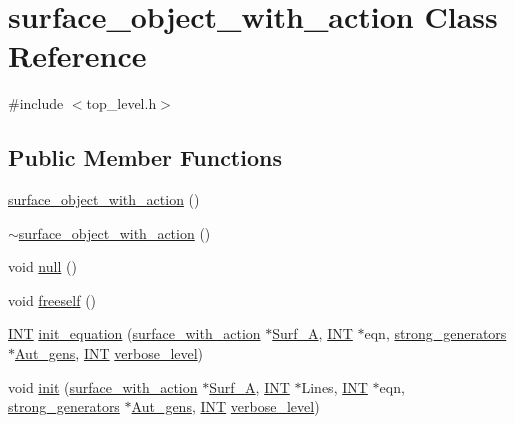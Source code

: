 \hypertarget{classsurface__object__with__action}{}\section{surface\+\_\+object\+\_\+with\+\_\+action Class Reference}
\label{classsurface__object__with__action}


{\ttfamily \#include $<$top\+\_\+level.\+h$>$}

\subsection*{Public Member Functions}
\begin{DoxyCompactItemize}
\item 
\mbox{\hyperlink{classsurface__object__with__action_a0bbd7fbace8f0057225b08c708c53d8d}{surface\+\_\+object\+\_\+with\+\_\+action}} ()
\item 
\mbox{\hyperlink{classsurface__object__with__action_a037d0d8b8dd76f7d37a827aef76b48eb}{$\sim$surface\+\_\+object\+\_\+with\+\_\+action}} ()
\item 
void \mbox{\hyperlink{classsurface__object__with__action_af479f5bae9a726bdc114648d0866a54f}{null}} ()
\item 
void \mbox{\hyperlink{classsurface__object__with__action_a736510cad6c3cd2dd2f554bcf05d5293}{freeself}} ()
\item 
\mbox{\hyperlink{galois_8h_a09fddde158a3a20bd2dcadb609de11dc}{I\+NT}} \mbox{\hyperlink{classsurface__object__with__action_a310ce4189e50545dd67fa3652b8fd160}{init\+\_\+equation}} (\mbox{\hyperlink{classsurface__with__action}{surface\+\_\+with\+\_\+action}} $\ast$\mbox{\hyperlink{classsurface__object__with__action_af67a9dfb692ea4ec1b68f77c76ee68d8}{Surf\+\_\+A}}, \mbox{\hyperlink{galois_8h_a09fddde158a3a20bd2dcadb609de11dc}{I\+NT}} $\ast$eqn, \mbox{\hyperlink{classstrong__generators}{strong\+\_\+generators}} $\ast$\mbox{\hyperlink{classsurface__object__with__action_ae839ddd92faa0cb8a5edf27505b3e43e}{Aut\+\_\+gens}}, \mbox{\hyperlink{galois_8h_a09fddde158a3a20bd2dcadb609de11dc}{I\+NT}} \mbox{\hyperlink{simeon_8_c_a818073fbcc2f439e7c56952f67386122}{verbose\+\_\+level}})
\item 
void \mbox{\hyperlink{classsurface__object__with__action_ad282ab47ac9623de9053b626c87ef44d}{init}} (\mbox{\hyperlink{classsurface__with__action}{surface\+\_\+with\+\_\+action}} $\ast$\mbox{\hyperlink{classsurface__object__with__action_af67a9dfb692ea4ec1b68f77c76ee68d8}{Surf\+\_\+A}}, \mbox{\hyperlink{galois_8h_a09fddde158a3a20bd2dcadb609de11dc}{I\+NT}} $\ast$Lines, \mbox{\hyperlink{galois_8h_a09fddde158a3a20bd2dcadb609de11dc}{I\+NT}} $\ast$eqn, \mbox{\hyperlink{classstrong__generators}{strong\+\_\+generators}} $\ast$\mbox{\hyperlink{classsurface__object__with__action_ae839ddd92faa0cb8a5edf27505b3e43e}{Aut\+\_\+gens}}, \mbox{\hyperlink{galois_8h_a09fddde158a3a20bd2dcadb609de11dc}{I\+NT}} \mbox{\hyperlink{simeon_8_c_a818073fbcc2f439e7c56952f67386122}{verbose\+\_\+level}})

\end{DoxyCompactItemize}
